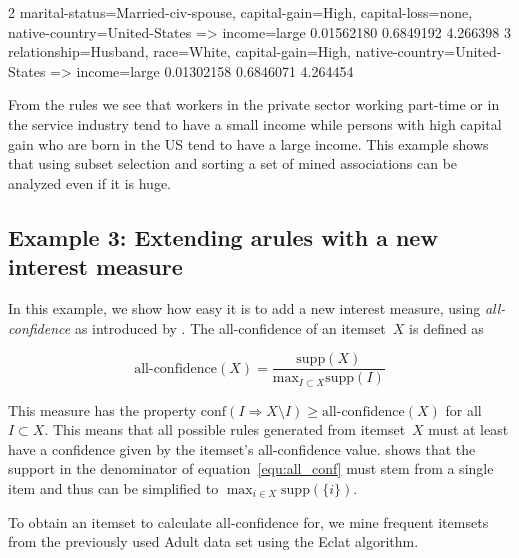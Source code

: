 \documentclass[10pt,a4paper]{article}
\begin{document}
{\begin{Schunk}
\begin{Soutput}
2 {marital-status=Married-civ-spouse,                                                 
    capital-gain=High,                                                                
    capital-loss=none,                                                                
    native-country=United-States}     => {income=large} 0.01562180  0.6849192 4.266398
3 {relationship=Husband,                                                              
    race=White,                                                                       
    capital-gain=High,                                                                
    native-country=United-States}     => {income=large} 0.01302158  0.6846071 4.264454
\end{Soutput}
\end{Schunk}
}

From the rules we see that workers in the private sector working part-time or
in the service industry tend to have a small income
while persons with high capital gain who are born in the US tend to have a
large income.
This example shows that using subset selection and sorting a
set of mined associations can be
analyzed even if it is huge.

\subsection{Example 3: Extending arules with a new interest measure\label{sec:example-allconf}}

In this example, we show how easy it is to add a new interest measure,
using \emph{all-confidence} as introduced by
\cite{arules:Omiecinski:2003}.  The all-confidence of an itemset~$X$ is
defined as

\begin{equation}
\mbox{all-confidence}(X) = \frac{\mathrm{supp}(X)}
{\mathrm{max}_{I \subset X} \mathrm{supp}(I)}
\label{equ:all_conf}
\end{equation}

This measure has the property $\mathrm{conf}(I \Rightarrow X \setminus
I) \ge \mbox{all-confidence}(X)$ for all $I \subset X$.  This means that
all possible rules generated from itemset~$X$ must at least have a
confidence given by the itemset's all-confidence value.
\cite{arules:Omiecinski:2003} shows that the support in the denominator
of equation~\ref{equ:all_conf} must stem from a single item and thus can
be simplified to $\max_{i \in X} \mathrm{supp}(\{i\})$.

To obtain an itemset to calculate all-confidence for, we mine frequent
itemsets from the previously used Adult data set using the Eclat
algorithm.
\end{document}

